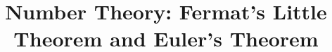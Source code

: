 \documentclass[a4paper,12pt]{article}
\begin{document}
\title{Number Theory: Fermat's Little Theorem and Euler's Theorem}
\newcommand\event{S.3,4 Elite Mathematics Training}
\newcommand\learningobjective{
\item Learn the concept of order
\item Learn Fermat's Little Theorem and Euler's Theorem
}

\myfrontpage




\mynewpage



\mynewpage


\begin{question}[]{4}
    
    
    
    
    
    
    
    
\end{question}
\end{document}

